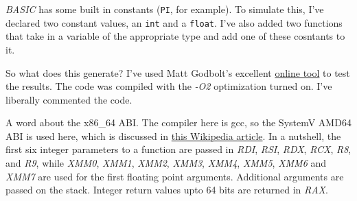 \documentclass{article}
\begin{document}
\emph{BASIC} has some built in constants (\lstinline|PI|, for example). To simulate 
this, I’ve declared two constant values, an \lstinline|int| and a \lstinline|float|. 
I’ve also added two functions that take in a variable of the appropriate type and 
add one of these cosntants to it.

So what does this generate? I’ve used Matt Godbolt’s excellent 
\href{https://godbolt.org/}{online tool} to test the results. The code was 
compiled with the \emph{-O2} optimization turned on. I’ve liberally commented the 
code.

A word about the x86\_64 ABI. The compiler here is gcc, so the SystemV AMD64 ABI 
is used here, which is discussed in 
\href{https://en.wikipedia.org/wiki/X86\_calling\_conventions}{this Wikipedia article}. 
In a nutshell, the first six integer parameters to a function are passed in 
\emph{RDI}, \emph{RSI}, \emph{RDX}, \emph{RCX}, \emph{R8}, and \emph{R9}, while 
\emph{XMM0}, \emph{XMM1}, \emph{XMM2}, \emph{XMM3}, \emph{XMM4}, \emph{XMM5}, 
\emph{XMM6} and \emph{XMM7} are used for the first floating point arguments. 
Additional arguments are passed on the stack. Integer return values upto 64 bits 
are returned in \emph{RAX}.
\end{document}
